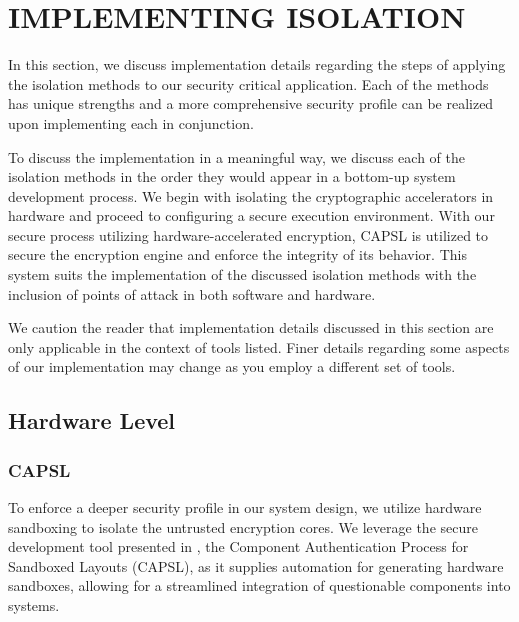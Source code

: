 \documentclass[sigconf]{acmart}
\theoremstyle{plain}
\theoremstyle{remark}
\begin{document}
\section{IMPLEMENTING ISOLATION} \label{sec:Implementation}
In this section, we discuss implementation details regarding the steps of applying the isolation methods to our security critical application. Each of the methods has unique strengths and a more comprehensive security profile can be realized upon implementing each in conjunction.

To discuss the implementation in a meaningful way, we discuss each of the isolation methods in the order they would appear in a bottom-up system development process. We begin with isolating the cryptographic accelerators in hardware and proceed to configuring a secure execution environment. With our secure process utilizing hardware-accelerated encryption, CAPSL is utilized to secure the encryption engine and enforce the integrity of its behavior. This system suits the implementation of the discussed isolation methods with the inclusion of points of attack in both software and hardware.

We caution the reader that implementation details discussed in this section are only applicable in the context of tools listed. Finer details regarding some aspects of our implementation may change as you employ a different set of tools.

\subsection{Hardware Level} \label{sec:hardware}
\subsubsection{CAPSL}
To enforce a deeper security profile in our system design, we utilize hardware sandboxing to isolate the untrusted encryption cores. We leverage the secure development tool presented in \cite{CAPSL}, the Component Authentication Process for Sandboxed Layouts (CAPSL), as it supplies automation for generating hardware sandboxes, allowing for a streamlined integration of questionable components into systems.
\end{document}

